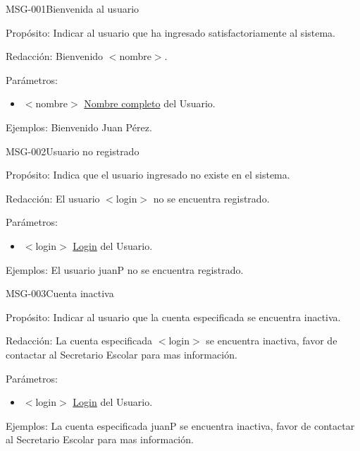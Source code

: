 \begin{cdtMessage}[msgInfoColor]{MSG-001}{Bienvenida al usuario}
	\item[Propósito:] Indicar al usuario que ha ingresado satisfactoriamente al sistema.
	\item[Redacción:] Bienvenido $<$nombre$>$.
	\item[Parámetros:] \hspace{1cm}
	\begin{itemize}
		\item $<$nombre$>$ \hyperlink{Usuario.nombre}{Nombre completo} del Usuario.
	\end{itemize}
	\item[Ejemplos:] Bienvenido Juan Pérez.
\end{cdtMessage}

\begin{cdtMessage}{MSG-002}{Usuario no registrado} 
	\item[Propósito:] Indica que el usuario ingresado no existe en el sistema.
	\item[Redacción:] El usuario $<$login$>$ no se encuentra registrado.
	\item[Parámetros:] \hspace{1cm}
	\begin{itemize}
		\item $<$login$>$ \hyperlink{Usuario.login}{Login} del Usuario.
	\end{itemize}
	\item[Ejemplos:] El usuario juanP no se encuentra registrado.
\end{cdtMessage}

\begin{cdtMessage}[msgErrorColor]{MSG-003}{Cuenta inactiva} 
	\item[Propósito:] Indicar al usuario que la cuenta especificada se encuentra inactiva.
	\item[Redacción:] La cuenta especificada $<$login$>$ se encuentra inactiva, favor de contactar al Secretario Escolar para mas información.
	\item[Parámetros:] \hspace{1cm}
	\begin{itemize}
		\item $<$login$>$ \hyperlink{Usuario.login}{Login} del Usuario.
	\end{itemize}
	\item[Ejemplos:] La cuenta especificada juanP se encuentra inactiva, favor de contactar al Secretario Escolar para mas información.
\end{cdtMessage}

